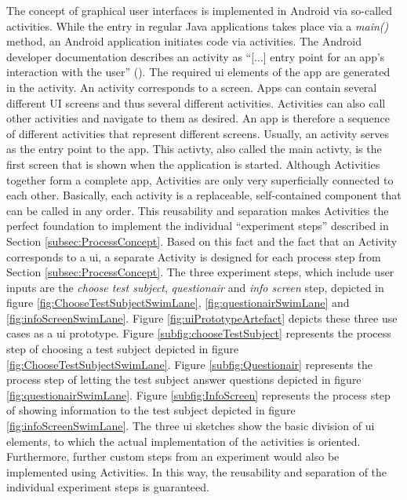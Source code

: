 The concept of graphical user interfaces is implemented in Android via so-called activities. While the entry in regular Java applications takes place via a \textit{main()} method, an Android application initiates code via activities. The Android developer documentation describes an activity as \enquote{[...] entry point for an app's interaction with the user} (\cite{Google.2023}). The required \ac{ui} elements of the app are generated in the activity. An activity corresponds to a screen. Apps can contain several different UI screens and thus several different activities. Activities can also call other activities and navigate to them as desired. An app is therefore a sequence of different activities that represent different screens. Usually, an activity serves as the entry point to the app. This activty, also called the main activty, is the first screen that is shown when the application is started. Although Activities together form a complete app, Activities are only very superficially connected to each other. Basically, each activity is a replaceable, self-contained component that can be called in any order. This reusability and separation makes Activities the perfect foundation to implement the individual \enquote{experiment steps} described in Section \ref{subsec:ProcessConcept}. Based on this fact and the fact that an Activity corresponds to a \ac{ui}, a separate Activity is designed for each process step from Section \ref{subsec:ProcessConcept}. The three experiment steps, which include user inputs are the \textit{choose test subject}, \textit{questionair} and \textit{info screen} step, depicted in figure \ref{fig:ChooseTestSubjectSwimLane}, \ref{fig:questionairSwimLane} and \ref{fig:infoScreenSwimLane}. Figure \ref{fig:uiPrototypeArtefact} depicts these three use cases as a \ac{ui} prototype. Figure \ref{subfig:chooseTestSubject} represents the process step of choosing a test subject depicted in figure \ref{fig:ChooseTestSubjectSwimLane}. Figure \ref{subfig:Questionair} represents the process step of letting the test subject answer questions depicted in figure \ref{fig:questionairSwimLane}. Figure \ref{subfig:InfoScreen}  represents the process step of showing information to the test subject depicted in figure \ref{fig:infoScreenSwimLane}. The three \ac{ui} sketches show the basic division of \ac{ui} elements, to which the actual implementation of the activities is oriented. Furthermore, further custom steps from an experiment would also be implemented using Activities. In this way, the reusability and separation of the individual experiment steps is guaranteed.


